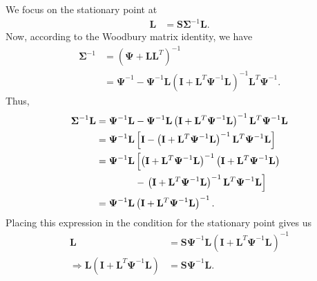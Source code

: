 \documentclass[12pt]{article}
\begin{document}
We focus on the stationary point at 
\begin{align}
 \mathbf{L} &= \mathbf{S} \boldsymbol{\Sigma}^{-1} \mathbf{L}.
\end{align}
Now, according to the Woodbury matrix identity, we have
\begin{align}
	\boldsymbol{\Sigma}^{-1} &= (\boldsymbol{\Psi} + \mathbf{LL}^T)^{-1} \\
	&= \boldsymbol{\Psi}^{-1} - \boldsymbol{\Psi}^{-1} \mathbf{L} \left(\mathbf{I} + \mathbf{L}^T \boldsymbol{\Psi}^{-1} \mathbf{L} \right)^{-1} \mathbf{L}^T\boldsymbol{\Psi}^{-1}.
\end{align}
Thus,
\begin{align}
	\boldsymbol{\Sigma}^{-1} \mathbf{L} &= \boldsymbol{\Psi}^{-1}\mathbf{L} - \boldsymbol{\Psi}^{-1} \mathbf{L} \left(\mathbf{I} + \mathbf{L}^T \boldsymbol{\Psi}^{-1} \mathbf{L} \right)^{-1} \mathbf{L}^T\boldsymbol{\Psi}^{-1} \mathbf{L} \\
	&= \boldsymbol{\Psi}^{-1}\mathbf{L} \left[\mathbf{I} -  \left(\mathbf{I} + \mathbf{L}^T \boldsymbol{\Psi}^{-1} \mathbf{L} \right)^{-1} \mathbf{L}^T \boldsymbol{\Psi}^{-1}\mathbf{L}\right] \\
	&=  \boldsymbol{\Psi}^{-1}\mathbf{L} \left[\left(\mathbf{I} + \mathbf{L}^T \boldsymbol{\Psi}^{-1} \mathbf{L} \right)^{-1}\left(\mathbf{I} + \mathbf{L}^T \boldsymbol{\Psi}^{-1} \mathbf{L} \right) \right. \notag \\
	& \qquad \qquad -  \left.\left(\mathbf{I} + \mathbf{L}^T \boldsymbol{\Psi}^{-1} \mathbf{L} \right)^{-1} \mathbf{L}^T \boldsymbol{\Psi}^{-1}\mathbf{L}\right]\\
	&= \boldsymbol{\Psi}^{-1}\mathbf{L}\left(\mathbf{I} + \mathbf{L}^T \boldsymbol{\Psi}^{-1}\mathbf{L}\right)^{-1}.
\end{align}
Placing this expression in the condition for the stationary point gives us 
\begin{align}
	\mathbf{L} &= \mathbf{S} \boldsymbol{\Psi}^{-1}\mathbf{L}\left(\mathbf{I} + \mathbf{L}^T \boldsymbol{\Psi}^{-1}\mathbf{L}\right)^{-1} \\
	\Rightarrow \mathbf{L}\left(\mathbf{I} + \mathbf{L}^T \boldsymbol{\Psi}^{-1}\mathbf{L}\right) &= \mathbf{S}\boldsymbol{\Psi}^{-1} \mathbf{L}.
\end{align}
\end{document}
